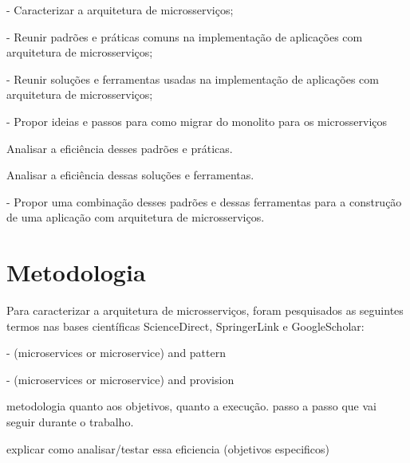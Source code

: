 - Caracterizar a arquitetura de microsserviços;

- Reunir padrões e práticas comuns na implementação de aplicações com arquitetura de microsserviços;

- Reunir soluções e ferramentas usadas na implementação de aplicações com arquitetura de microsserviços;

- Propor ideias e passos para como migrar do monolito para os microsserviços

Analisar a eficiência desses padrões e práticas.

Analisar a eficiência dessas soluções e ferramentas.

- Propor uma combinação desses padrões e dessas ferramentas para a construção de uma aplicação com arquitetura de microsserviços.

\section{Metodologia}

Para caracterizar a arquitetura de microsserviços, foram pesquisados as seguintes termos nas bases científicas ScienceDirect, SpringerLink e GoogleScholar:

- (microservices or microservice) and pattern

- (microservices or microservice) and provision

metodologia quanto aos objetivos, quanto a execução. passo a passo que vai seguir durante o trabalho.

explicar como analisar/testar essa eficiencia (objetivos especificos)